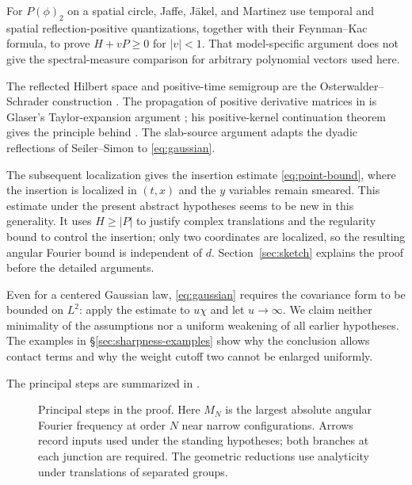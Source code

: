 \documentclass[11pt, letterpaper, reqno]{amsart}
\theoremstyle{definition}
\theoremstyle{remark}
\begin{document}
For $P(\phi)_2$ on a spatial circle, Jaffe, J\"akel, and Martinez
\cite[Proposition~VI.1 and (VI.4)--(VI.5)]{JJM} use temporal and spatial
reflection-positive quantizations, together with their Feynman--Kac
formula, to prove $H+vP\geq0$ for $|v|<1$. That model-specific argument
does not give the spectral-measure comparison for arbitrary polynomial
vectors used here.

The reflected Hilbert space and positive-time semigroup are the
Osterwalder--Schrader construction \cite[\S4.1, (4.3)--(4.9)]{OS}.
The propagation of positive derivative matrices in
 is Glaser's Taylor-expansion argument
\cite[\S3, p.~14]{Glaser1969}; his positive-kernel continuation theorem
\cite[Theorem~A]{Glaser} gives the principle behind
. The slab-source argument adapts the
dyadic reflections of Seiler--Simon
\cite[Theorems~4.3 and~7.1]{SeilerSimon} to \eqref{eq:gaussian}.

The subsequent localization gives the insertion estimate
\eqref{eq:point-bound}, where the insertion is localized in $(t,x)$
and the $y$ variables remain smeared. This estimate under the present
abstract hypotheses seems to be new in this generality. It uses
$H\geq|P|$ to justify complex translations and the regularity bound
to control the insertion; only two coordinates are localized, so the
resulting angular Fourier bound is independent of $d$.
Section~\ref{sec:sketch} explains the proof before the detailed arguments.

Even for a centered Gaussian law, \eqref{eq:gaussian} requires the
covariance form to be bounded on $L^2$: apply the estimate to $u\chi$
and let $u\to\infty$. We claim neither
minimality of the assumptions nor a uniform weakening of all earlier
hypotheses. The examples in \S\ref{sec:sharpness-examples} show why the
conclusion allows contact terms and why the weight cutoff two cannot
be enlarged uniformly.


The principal steps are summarized in .
\begin{figure}[p]
\centering

\caption{Principal steps in the proof. Here $M_N$ is the largest absolute
angular Fourier frequency at order $N$ near narrow configurations.
Arrows record inputs used under the standing hypotheses; both branches
at each junction are required. The geometric reductions use analyticity
under translations of separated groups.}
\label{fig:proof-overview}
\end{figure}
\clearpage
\end{document}
